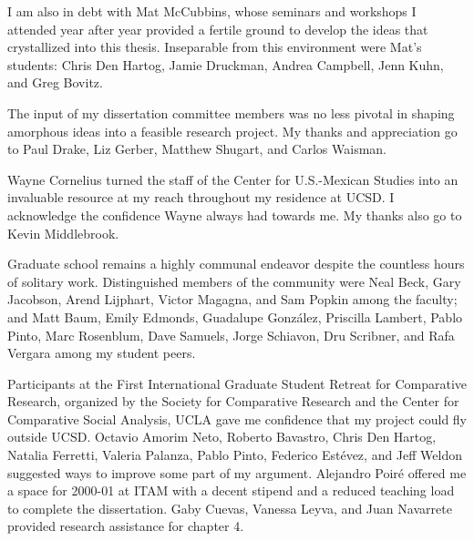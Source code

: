 I am also in debt with Mat McCubbins, whose seminars and workshops I attended year after year provided a fertile ground to develop the ideas that crystallized into this thesis.  Inseparable from this environment were Mat's students: Chris Den Hartog, Jamie Druckman, Andrea Campbell, Jenn Kuhn, and Greg Bovitz.  

The input of my dissertation committee members was no less pivotal in shaping amorphous ideas into a feasible research project.  My thanks and appreciation go to Paul Drake, Liz Gerber, Matthew Shugart, and Carlos Waisman.  

Wayne Cornelius turned the staff of the Center for U.S.-Mexican Studies into an invaluable resource at my reach throughout my residence at UCSD.  I acknowledge the confidence Wayne always had towards me.  My thanks also go to Kevin Middlebrook.  

Graduate school remains a highly communal endeavor despite the countless hours of solitary work.  Distinguished members of the community were Neal Beck, Gary Jacobson, Arend Lijphart, Victor Magagna, and Sam Popkin among the faculty; and Matt Baum, Emily Edmonds, Guadalupe González, Priscilla Lambert, Pablo Pinto, Marc Rosenblum, Dave Samuels, Jorge Schiavon, Dru Scribner, and Rafa Vergara among my student peers.  

Participants at the First International Graduate Student Retreat for Comparative Research, organized by the Society for Comparative Research and the Center for Comparative Social Analysis, UCLA gave me confidence that my project could fly outside UCSD.  Octavio Amorim Neto, Roberto Bavastro, Chris Den Hartog, Natalia Ferretti, Valeria Palanza, Pablo Pinto, Federico Estévez, and Jeff Weldon suggested ways to improve some part of my argument.  Alejandro Poiré offered me a space for 2000-01 at ITAM with a decent stipend and a reduced teaching load to complete the dissertation.  Gaby Cuevas, Vanessa Leyva, and Juan Navarrete provided research assistance for chapter 4.  

